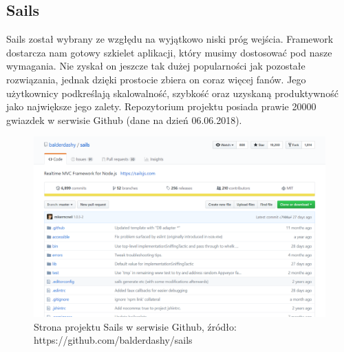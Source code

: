 \documentclass[12pt]{report}
\begin{document}
    \subsection{Sails}
      Sails został wybrany ze wzgłędu na wyjątkowo niski próg wejścia.
      Framework dostarcza nam gotowy szkielet aplikacji, który musimy dostosować pod nasze wymagania.
      Nie zyskał on jeszcze tak dużej popularności jak pozostałe rozwiązania, jednak dzięki prostocie zbiera on coraz więcej fanów.
      Jego użytkownicy podkreślają skalowalność, szybkość oraz uzyskaną produktywność jako największe jego zalety.
      Repozytorium projektu posiada prawie 20000 gwiazdek w serwisie Github (dane na dzień 06.06.2018).
      \begin{figure}[!hb]
        \centering
        \includegraphics[width=\textwidth,height=\textheight,keepaspectratio]{sails.png} 
        \caption{Strona projektu Sails w serwisie Github, źródło: https://github.com/balderdashy/sails}
      \end{figure}
\end{document}
